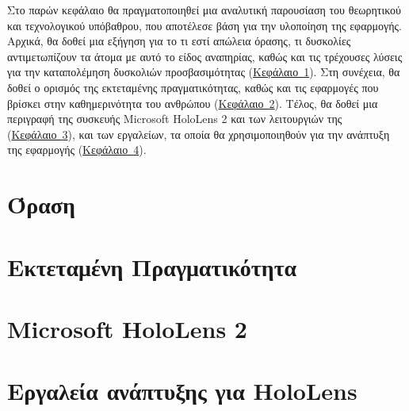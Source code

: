 
Στο παρών κεφάλαιο θα πραγματοποιηθεί μια αναλυτική παρουσίαση του θεωρητικού και τεχνολογικού υπόβαθρου, που αποτέλεσε βάση για την υλοποίηση της εφαρμογής. Αρχικά, θα δοθεί μια εξήγηση για το τι εστί απώλεια όρασης, τι δυσκολίες αντιμετωπίζουν τα άτομα με αυτό το είδος αναπηρίας, καθώς και τις τρέχουσες λύσεις για την καταπολέμηση δυσκολιών προσβασιμότητας (\hyperref[sec:visualImpairment]{Κεφάλαιο~\ref*{sec:visualImpairment}}). Στη συνέχεια, θα δοθεί ο ορισμός της εκτεταμένης πραγματικότητας, καθώς και τις εφαρμογές που βρίσκει στην καθημερινότητα του ανθρώπου (\hyperref[sec:extendedReality]{Κεφάλαιο~\ref*{sec:extendedReality}}). Τέλος, θα δοθεί μια περιγραφή της συσκευής Microsoft HoloLens 2 και των λειτουργιών της (\hyperref[sec:hololensDesc]{Κεφάλαιο~\ref*{sec:hololensDesc}}), και των εργαλείων, τα οποία θα χρησιμοποιηθούν για την ανάπτυξη της εφαρμογής (\hyperref[sec:hololensTools]{Κεφάλαιο~\ref*{sec:hololensTools}}).

\section{Όραση}\label{sec:visualImpairment}



\section{Εκτεταμένη Πραγματικότητα}\label{sec:extendedReality}



\section{Microsoft HoloLens 2}\label{sec:hololensDesc}




\section{Εργαλεία ανάπτυξης για HoloLens}\label{sec:hololensTools}


